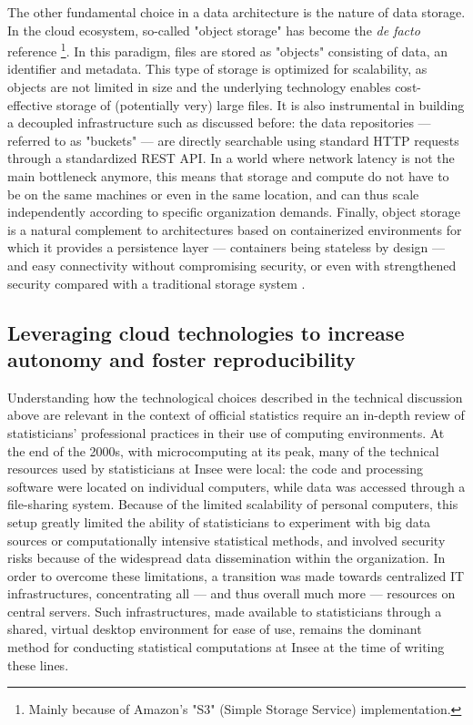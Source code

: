 \documentclass[graybox]{svmult}
\begin{document}
The other fundamental choice in a data architecture is the nature of data storage. In the cloud ecosystem, so-called "object storage" has become the {\it de facto} reference \cite{samundiswary2017object}\footnote{Mainly because of Amazon's "S3" (Simple Storage Service) implementation.}. In this paradigm, files are stored as "objects" consisting of data, an identifier and metadata. This type of storage is optimized for scalability, as objects are not limited in size and the underlying technology enables cost-effective storage of (potentially very) large files. It is also instrumental in building a decoupled infrastructure such as discussed before: the data repositories — referred to as "buckets" — are directly searchable using standard HTTP requests through a standardized REST API. In a world where network latency is not the main bottleneck anymore, this means that storage and compute do not have to be on the same machines or even in the same location, and can thus scale independently according to specific organization demands. Finally, object storage is a natural complement to architectures based on containerized environments for which it provides a persistence layer — containers being stateless by design — and easy connectivity without compromising security, or even with strengthened security compared with a traditional storage system \cite{mesnier2003object}.

\subsection{Leveraging cloud technologies to increase autonomy and foster reproducibility}

Understanding how the technological choices described in the technical discussion above are relevant in the context of official statistics require an in-depth review of statisticians’ professional practices in their use of computing environments. At the end of the 2000s, with microcomputing at its peak, many of the technical resources used by statisticians at Insee were local: the code and processing software were located on individual computers, while data was accessed through a file-sharing system. Because of the limited scalability of personal computers, this setup greatly limited the ability of statisticians to experiment with big data sources or computationally intensive statistical methods, and involved security risks because of the widespread data dissemination within the organization. In order to overcome these limitations, a transition was made towards centralized IT infrastructures, concentrating all — and thus overall much more — resources on central servers. Such infrastructures, made available to statisticians through a shared, virtual desktop environment for ease of use, remains the dominant method for conducting statistical computations at Insee at the time of writing these lines.
\end{document}
